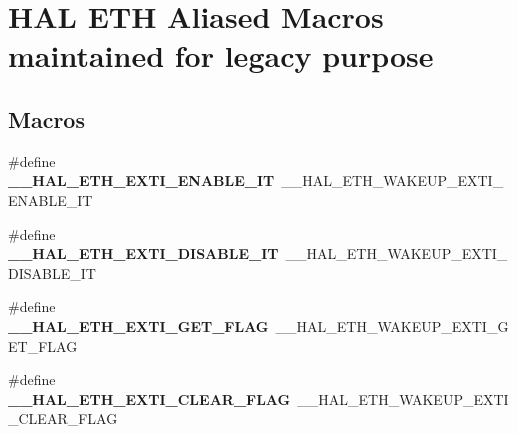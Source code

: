 \hypertarget{group___h_a_l___e_t_h___aliased___macros}{}\section{H\+AL E\+TH Aliased Macros maintained for legacy purpose}
\label{group___h_a_l___e_t_h___aliased___macros}
\subsection*{Macros}
\begin{DoxyCompactItemize}
\item 
\#define {\bfseries \+\_\+\+\_\+\+H\+A\+L\+\_\+\+E\+T\+H\+\_\+\+E\+X\+T\+I\+\_\+\+E\+N\+A\+B\+L\+E\+\_\+\+IT}~\+\_\+\+\_\+\+H\+A\+L\+\_\+\+E\+T\+H\+\_\+\+W\+A\+K\+E\+U\+P\+\_\+\+E\+X\+T\+I\+\_\+\+E\+N\+A\+B\+L\+E\+\_\+\+IT\hypertarget{group___h_a_l___e_t_h___aliased___macros_gad96bacd190bd8ba2523e83be7b1432d8}{}\label{group___h_a_l___e_t_h___aliased___macros_gad96bacd190bd8ba2523e83be7b1432d8}

\item 
\#define {\bfseries \+\_\+\+\_\+\+H\+A\+L\+\_\+\+E\+T\+H\+\_\+\+E\+X\+T\+I\+\_\+\+D\+I\+S\+A\+B\+L\+E\+\_\+\+IT}~\+\_\+\+\_\+\+H\+A\+L\+\_\+\+E\+T\+H\+\_\+\+W\+A\+K\+E\+U\+P\+\_\+\+E\+X\+T\+I\+\_\+\+D\+I\+S\+A\+B\+L\+E\+\_\+\+IT\hypertarget{group___h_a_l___e_t_h___aliased___macros_ga2e18c5d21291947835cdefeecdd061ec}{}\label{group___h_a_l___e_t_h___aliased___macros_ga2e18c5d21291947835cdefeecdd061ec}

\item 
\#define {\bfseries \+\_\+\+\_\+\+H\+A\+L\+\_\+\+E\+T\+H\+\_\+\+E\+X\+T\+I\+\_\+\+G\+E\+T\+\_\+\+F\+L\+AG}~\+\_\+\+\_\+\+H\+A\+L\+\_\+\+E\+T\+H\+\_\+\+W\+A\+K\+E\+U\+P\+\_\+\+E\+X\+T\+I\+\_\+\+G\+E\+T\+\_\+\+F\+L\+AG\hypertarget{group___h_a_l___e_t_h___aliased___macros_gab8cb753cb998d6d2d65f2ce0bee7c384}{}\label{group___h_a_l___e_t_h___aliased___macros_gab8cb753cb998d6d2d65f2ce0bee7c384}

\item 
\#define {\bfseries \+\_\+\+\_\+\+H\+A\+L\+\_\+\+E\+T\+H\+\_\+\+E\+X\+T\+I\+\_\+\+C\+L\+E\+A\+R\+\_\+\+F\+L\+AG}~\+\_\+\+\_\+\+H\+A\+L\+\_\+\+E\+T\+H\+\_\+\+W\+A\+K\+E\+U\+P\+\_\+\+E\+X\+T\+I\+\_\+\+C\+L\+E\+A\+R\+\_\+\+F\+L\+AG\hypertarget{group___h_a_l___e_t_h___aliased___macros_ga54ff39d1814de51ec16312fb209f2f41}{}\label{group___h_a_l___e_t_h___aliased___macros_ga54ff39d1814de51ec16312fb209f2f41}


\end{DoxyCompactItemize}
